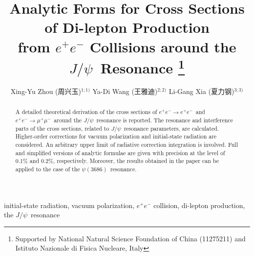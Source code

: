 \documentclass[a4paper,10pt,twoside]{cpc-hepnp}
\newcommand{\jpsi}{$J/\psi$~}
\newcommand{\psip}{$\psi(3686)$~}
\newcommand{\eetoee}{$e^+e^- \to e^+e^-$~}
\newcommand{\eetomumu}{$e^+e^- \to \mu^+\mu^-$~}
\begin{document}
\begin{CJK*}{UTF8}{gbsn}

%
\footnotetext[0]{}

%
\title{Analytic Forms for Cross Sections of Di-lepton Production \\ from $e^+e^-$ Collisions around the \jpsi Resonance \thanks{Supported by National Natural Science Foundation of China (11275211) and Istituto Nazionale di Fisica Nucleare, Italy}}

\author{Xing-Yu Zhou (周兴玉)$^{1;1)}$  \quad Ya-Di Wang (王雅迪)$^{2;2)}$  \quad Li-Gang Xia (夏力钢)$^{3;3)}$ }

\maketitle

\address
{
	$^1$ Institute of High Energy Physics, Chinese Academy of Sciences, Beijing 100049, China \\
	$^2$ Helmholtz Institute Mainz, Mainz 55128, Germany \\
	$^3$ Department of Physics, Tsinghua University, Beijing 100084, China
}


%
\begin{abstract}
	A detailed theoretical derivation of the cross sections of \eetoee and \eetomumu around the \jpsi resonance is reported. The resonance and interference parts of the cross sections, related to \jpsi resonance parameters, are calculated. Higher-order corrections for vacuum polarization and initial-state radiation are considered. An arbitrary upper limit of radiative correction integration is involved. Full and simplified versions of analytic formulae are given with precision at the level of 0.1\% and 0.2\%, respectively. Moreover, the results obtained in the paper can be applied to the case of the \psip resonance.
\end{abstract}

\begin{keyword}
	initial-state radiation, vacuum polarization, $e^+e^-$ collision, di-lepton production, the \jpsi resonance
\end{keyword}


\end{CJK*}
\end{document}
